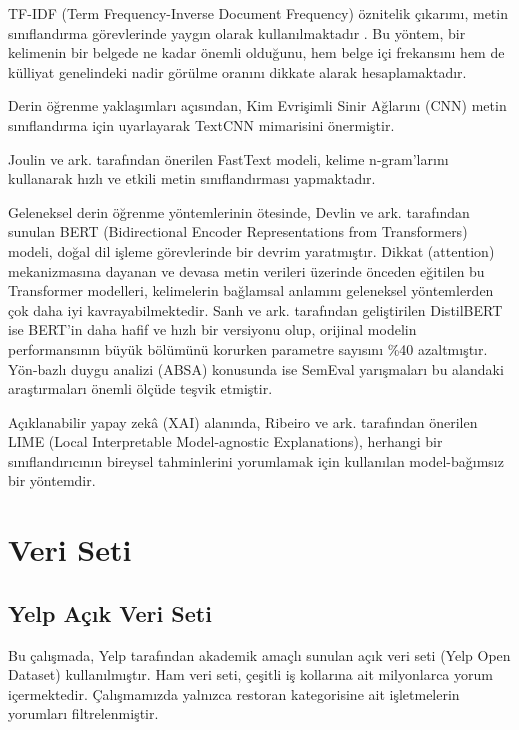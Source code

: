 \documentclass[conference]{IEEEtran}
\begin{document}
TF-IDF (Term Frequency-Inverse Document Frequency) öznitelik çıkarımı, metin sınıflandırma görevlerinde yaygın olarak kullanılmaktadır \cite{salton1988term}. Bu yöntem, bir kelimenin bir belgede ne kadar önemli olduğunu, hem belge içi frekansını hem de külliyat genelindeki nadir görülme oranını dikkate alarak hesaplamaktadır.

Derin öğrenme yaklaşımları açısından, Kim \cite{kim2014convolutional} Evrişimli Sinir Ağlarını (CNN) metin sınıflandırma için uyarlayarak TextCNN mimarisini önermiştir.

Joulin ve ark. \cite{joulin2017bag} tarafından önerilen FastText modeli, kelime n-gram'larını kullanarak hızlı ve etkili metin sınıflandırması yapmaktadır.

Geleneksel derin öğrenme yöntemlerinin ötesinde, Devlin ve ark. \cite{devlin2018bert} tarafından sunulan BERT (Bidirectional Encoder Representations from Transformers) modeli, doğal dil işleme görevlerinde bir devrim yaratmıştır. Dikkat (attention) mekanizmasına dayanan ve devasa metin verileri üzerinde önceden eğitilen bu Transformer modelleri, kelimelerin bağlamsal anlamını geleneksel yöntemlerden çok daha iyi kavrayabilmektedir. Sanh ve ark. \cite{sanh2019distilbert} tarafından geliştirilen DistilBERT ise BERT'in daha hafif ve hızlı bir versiyonu olup, orijinal modelin performansının büyük bölümünü korurken parametre sayısını \%40 azaltmıştır. Yön-bazlı duygu analizi (ABSA) konusunda ise SemEval yarışmaları \cite{pontiki2016semeval} bu alandaki araştırmaları önemli ölçüde teşvik etmiştir.

Açıklanabilir yapay zekâ (XAI) alanında, Ribeiro ve ark. \cite{ribeiro2016why} tarafından önerilen LIME (Local Interpretable Model-agnostic Explanations), herhangi bir sınıflandırıcının bireysel tahminlerini yorumlamak için kullanılan model-bağımsız bir yöntemdir.

\section{Veri Seti}
\label{sec:veriset}

\subsection{Yelp Açık Veri Seti}
Bu çalışmada, Yelp tarafından akademik amaçlı sunulan açık veri seti (Yelp Open Dataset) kullanılmıştır. Ham veri seti, çeşitli iş kollarına ait milyonlarca yorum içermektedir. Çalışmamızda yalnızca restoran kategorisine ait işletmelerin yorumları filtrelenmiştir.
\end{document}
